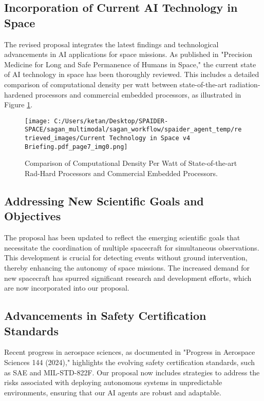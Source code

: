 \documentclass[a4paper,12pt]{article}
\begin{document}
\subsection{Incorporation of Current AI Technology in Space}

The revised proposal integrates the latest findings and technological advancements in AI applications for space missions. As published in "Precision Medicine for Long and Safe Permanence of Humans in Space," the current state of AI technology in space has been thoroughly reviewed. This includes a detailed comparison of computational density per watt between state-of-the-art radiation-hardened processors and commercial embedded processors, as illustrated in Figure \ref{fig:comp-density}.

\begin{figure}[htbp]
    \centering
    \texttt{[image: C:/Users/ketan/Desktop/SPAIDER-SPACE/sagan\_multimodal/sagan\_workflow/spaider\_agent\_temp/retrieved\_images/Current Technology in Space v4 Briefing.pdf\_page7\_img0.png]}
    \caption{Comparison of Computational Density Per Watt of State-of-the-art Rad-Hard Processors and Commercial Embedded Processors.}
    \label{fig:comp-density}
\end{figure}

\subsection{Addressing New Scientific Goals and Objectives}

The proposal has been updated to reflect the emerging scientific goals that necessitate the coordination of multiple spacecraft for simultaneous observations. This development is crucial for detecting events without ground intervention, thereby enhancing the autonomy of space missions. The increased demand for new spacecraft has spurred significant research and development efforts, which are now incorporated into our proposal.

\subsection{Advancements in Safety Certification Standards}

Recent progress in aerospace sciences, as documented in "Progress in Aerospace Sciences 144 (2024)," highlights the evolving safety certification standards, such as SAE and MIL-STD-822F. Our proposal now includes strategies to address the risks associated with deploying autonomous systems in unpredictable environments, ensuring that our AI agents are robust and adaptable.
\end{document}
